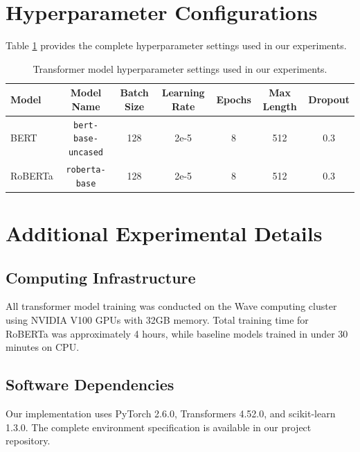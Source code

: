\documentclass[11pt]{article}
\begin{document}



\appendix

\section{Hyperparameter Configurations}
\label{sec:appendix}

Table \ref{tab:hyperparams} provides the complete hyperparameter settings used in our experiments.

\begin{table}[ht]
\centering
\small
\begin{tabular}{lcccccc}
\toprule
\textbf{Model} & \textbf{Model Name} & \textbf{Batch Size} & \textbf{Learning Rate} & \textbf{Epochs} & \textbf{Max Length} & \textbf{Dropout} \\
\midrule
BERT & \texttt{bert-base-uncased} & 128 & 2e-5 & 8 & 512 & 0.3 \\
RoBERTa & \texttt{roberta-base} & 128 & 2e-5 & 8 & 512 & 0.3 \\
\bottomrule
\end{tabular}
\caption{Transformer model hyperparameter settings used in our experiments.}
\label{tab:hyperparams}
\end{table}

\section{Additional Experimental Details}

\subsection{Computing Infrastructure}
All transformer model training was conducted on the Wave computing cluster using NVIDIA V100 GPUs with 32GB memory. Total training time for RoBERTa was approximately 4 hours, while baseline models trained in under 30 minutes on CPU.

\subsection{Software Dependencies}
Our implementation uses PyTorch 2.6.0, Transformers 4.52.0, and scikit-learn 1.3.0. The complete environment specification is available in our project repository.
\end{document}
